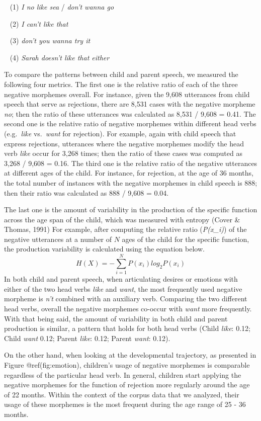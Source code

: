 \documentclass[10pt, letterpaper]{article}
\begin{document}
~ (1) \emph{I no like sea} / \emph{don't wanna go}

~ (2) \emph{I can't like that}

~ (3) \emph{don't you wanna try it}

~ (4) \emph{Sarah doesn't like that either}

To compare the patterns between child and parent speech, we measured the
following four metrics. The first one is the relative ratio of each of
the three negative morphemes overall. For instance, given the 9,608
utterances from child speech that serve as rejections, there are 8,531
cases with the negative morpheme \emph{no}; then the ratio of these
utterances was calculated as 8,531 / 9,608 = 0.41. The second one is the
relative ratio of negative morphemes within different head verbs
(e.g.~\emph{like} vs.~\emph{want} for rejection). For example, again
with child speech that express rejections, utterances where the negative
morphemes modify the head verb \emph{like} occur for 3,268 times; then
the ratio of these cases was computed as 3,268 / 9,608 = 0.16. The third
one is the relative ratio of the negative utterances at different ages
of the child. For instance, for rejection, at the age of 36 months, the
total number of instances with the negative morphemes in child speech is
888; then their ratio was calculated as 888 / 9,608 = 0.04.

The last one is the amount of variability in the production of the
specific function across the age span of the child, which was measured
with entropy (Cover \& Thomas, 1991) For example, after computing the
relative ratio (\emph{P(x\_i)}) of the negative utterances at a number
of \(N\) ages of the child for the specific function, the production
variability is calculated using the equation below. \[
H(X) = -\sum_{i=1}^N P(x_i)log_2P(x_i)               
\] In both child and parent speech, when articulating desires or
emotions with either of the two head verbs \emph{like} and \emph{want},
the most frequently used negative morpheme is \emph{n't} combined with
an auxiliary verb. Comparing the two different head verbs, overall the
negative morphemes co-occur with \emph{want} more frequently. With that
being said, the amount of variability in both child and parent
production is similar, a pattern that holds for both head verbs (Child
\emph{like}: 0.12; Child \emph{want} 0.12; Parent \emph{like}: 0.12;
Parent \emph{want}: 0.12).

On the other hand, when looking at the developmental trajectory, as
presented in Figure @ref(fig:emotion), children's usage of negative
morphemes is comparable regardless of the particular head verb. In
general, children start applying the negative morphemes for the function
of rejection more regularly around the age of 22 months. Within the
context of the corpus data that we analyzed, their usage of these
morphemes is the most frequent during the age range of 25 - 36 months.
\end{document}
